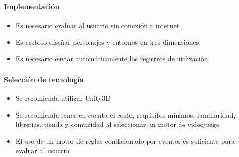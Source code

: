 \begin{frame}
\frametitle{\pagetitle}
\framesubtitle{Implementación}
\begin{itemize}[<+->]



    

\item Es necesario evaluar al usuario sin conexión a internet

\item Es costoso diseñar personajes y entornos en tres dimensiones

\item Es necesario enviar automáticamente los registros de utilización 

\end{itemize}
\end{frame}

\begin{frame}[noframenumbering]
\frametitle{\pagetitle}
\framesubtitle{Selección de tecnología}
\begin{itemize}[<+->]

\item Se recomienda utilizar Unity3D 

\item Se recomienda tener en cuenta el costo, requisitos mínimos, familiaridad,
librerías, tienda y comunidad al seleccionar un motor de videojuego

\item El uso de un motor de reglas condicionado por eventos es suficiente para
evaluar al usuario

\end{itemize}
\end{frame}

